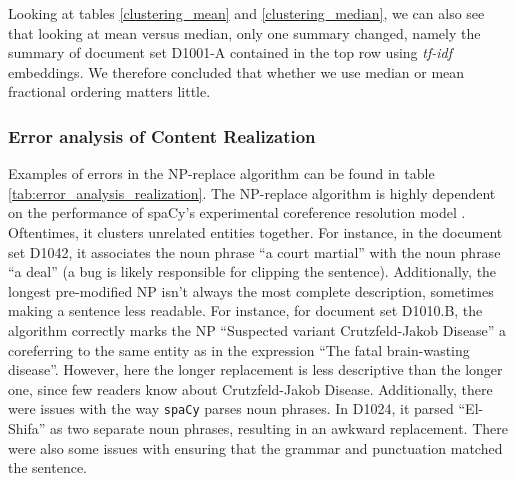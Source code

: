 Looking at tables \ref{clustering_mean} and \ref{clustering_median}, we can also see that looking at mean versus median, only one summary changed, namely the summary of document set D1001-A contained in the top row using \textit{tf-idf} embeddings. We therefore concluded that whether we use median or mean fractional ordering matters little. 

\subsubsection{Error analysis of Content Realization}

Examples of errors in the NP-replace algorithm can be found in table \ref{tab:error_analysis_realization}. The NP-replace algorithm is highly dependent on the performance of \texttt{}{spaCy}'s experimental coreference resolution model \cite{spacy}. Oftentimes, it clusters unrelated entities together. For instance, in the document set D1042, it associates the noun phrase ``a court martial'' with the noun phrase ``a deal'' (a bug is likely responsible for clipping the sentence). Additionally, the longest pre-modified NP isn't always the most complete description, sometimes making a sentence less readable. For instance, for document set D1010.B, the algorithm correctly marks the NP ``Suspected variant Crutzfeld-Jakob Disease'' a coreferring to the same entity as in the expression ``The fatal brain-wasting disease''. However, here the longer replacement is less descriptive than the longer one, since few readers know about Crutzfeld-Jakob Disease. Additionally, there were issues with the way \texttt{spaCy} parses noun phrases. In D1024, it parsed ``El-Shifa'' as two separate noun phrases, resulting in an awkward replacement. There were also some issues with ensuring that the grammar and punctuation matched the sentence.

